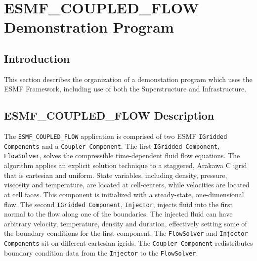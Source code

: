
\section{ESMF\_COUPLED\_FLOW Demonstration Program}
\label{sec:demo}

\subsection{Introduction}

This section describes the organization of a
demonstation program which uses the ESMF Framework,
including use of both the 
Superstructure and Infrastructure.

\subsection{ESMF\_COUPLED\_FLOW Description}
 
The {\tt ESMF\_COUPLED\_FLOW} application is comprised of two ESMF 
{\tt IGridded Components} and a {\tt Coupler Component}.  
The first {\tt IGridded Component}, {\tt FlowSolver}, solves the compressible 
time-dependent fluid flow equations.  The algorithm 
applies an explicit solution technique to a staggered, Arakawa C igrid 
that is cartesian and uniform.  State variables, including density, 
pressure, viscosity and temperature, are located at cell-centers, while 
velocities are located at cell faces.  This component is initialized 
with a steady-state, one-dimensional flow.  The second {\tt IGridded 
Component}, {\tt Injector}, injects fluid into the first normal to the 
flow along 
one of the boundaries.  The injected fluid can have arbitrary velocity, 
temperature, density and duration, effectively setting some of 
the boundary conditions for the first component.  The {\tt FlowSolver} and 
{\tt Injector Components} sit on different cartesian igrids.  The
{\tt Coupler Component} redistributes boundary condition data from 
the {\tt Injector} to the {\tt FlowSolver}.


